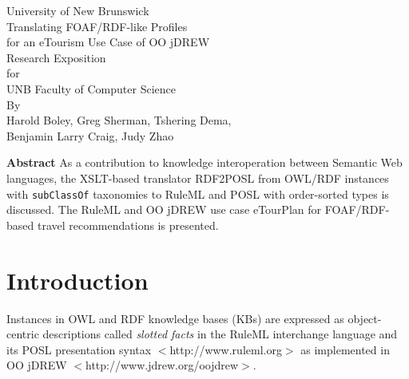 \documentclass [letterpaper] {Article}
\begin{document}
\begin{small}
\doublespacing
\large

\begin{titlepage}
\begin{center}
\vspace{10mm}
\Large University of New Brunswick\\
\vspace{10mm}
\Large{Translating FOAF/RDF-like Profiles}\\
\Large{for an eTourism Use Case of OO jDREW}\\
\vspace{5mm}
\Large {Research Exposition}
\\
\vspace{3.5mm}for
\\
\Large {UNB Faculty of Computer Science}\\
\vspace{10mm}
By\\
\vspace{5mm}Harold Boley, Greg Sherman, Tshering Dema,\\
\hspace{7mm}Benjamin Larry Craig, Judy Zhao\\
\vspace{10mm}
\begin{center}


\vspace{10mm}
\singlespacing
{\bf Abstract}
As a contribution to knowledge interoperation between Semantic Web
languages, the XSLT-based translator RDF2POSL from OWL/RDF instances
with {\tt subClassOf} taxonomies to RuleML and POSL with order-sorted
types is discussed. The RuleML and OO jDREW use case eTourPlan for
FOAF/RDF-based travel recommendations is presented.
\end{center}
\end{center}
\end{titlepage}
\newpage
\thispagestyle{empty}
\Large

\newpage
\singlespacing

\section{Introduction}

\hspace{0.3in}Instances in OWL and RDF knowledge bases (KBs) are expressed as object-centric descriptions called {\it slotted facts} in the RuleML interchange language and its POSL presentation syntax $<$http://www.ruleml.org$>$ as implemented in OO jDREW $<$http://www.jdrew.org/oojdrew$>$.


\end{small}
\end{document}

